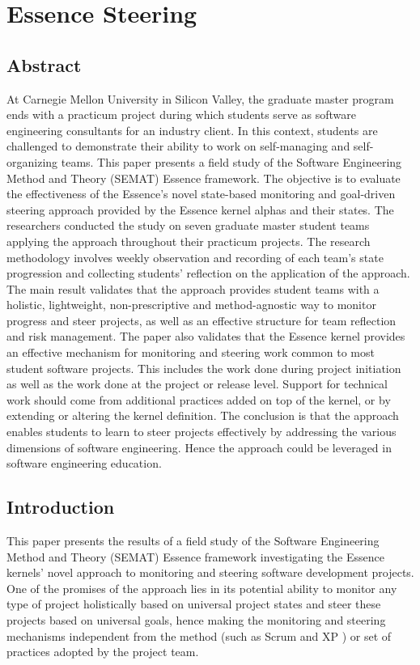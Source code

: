\chapter{Essence Steering}

\section{Abstract}
At Carnegie Mellon University in Silicon Valley, the graduate master program ends with a practicum project during which students serve as software engineering consultants for an industry client. In this context, students are challenged to demonstrate their ability to work on self-managing and self-organizing teams. This paper presents a field study of the Software Engineering Method and Theory (SEMAT) Essence framework. The objective is to evaluate the effectiveness of the Essence's novel state-based monitoring and goal-driven steering approach provided by the Essence kernel alphas and their states. The researchers conducted the study on seven graduate master student teams applying the approach throughout their practicum projects. The research methodology involves weekly observation and recording of each team's state progression and collecting students' reflection on the application of the approach. The main result validates that the approach provides student teams with a holistic, lightweight, non-prescriptive and method-agnostic way to monitor progress and steer projects, as well as an effective structure for team reflection and risk management. The paper also validates that the Essence kernel provides an effective mechanism for monitoring and steering work common to most student software projects. This includes the work done during project initiation as well as the work done at the project or release level. Support for technical work should come from additional practices added on top of the kernel, or by extending or altering the kernel definition. The conclusion is that the approach enables students to learn to steer projects effectively by addressing the various dimensions of software engineering. Hence the approach could be leveraged in software engineering education.

\section{Introduction}

This paper presents the results of a field study of the Software Engineering Method and Theory (SEMAT) Essence framework \cite{SEMATKernel, EssenceBook} investigating the Essence kernels' novel approach to monitoring and steering software development projects. One of the promises of the approach lies in its potential ability to monitor any type of project holistically based on universal project states and steer these projects based on universal goals, hence making the monitoring and steering mechanisms independent from the method (such as Scrum \cite{AgileProjectManagement} and XP \cite{BeckExtremeProgramming2000}) or set of practices adopted by the project team.

